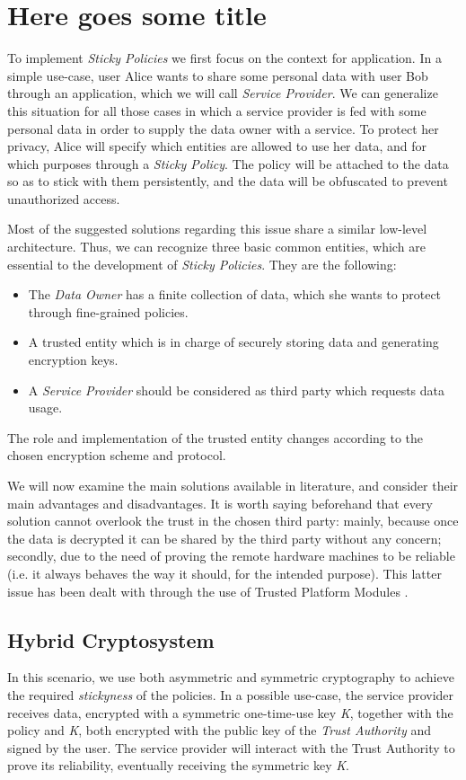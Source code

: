 \chapter{Here goes some title}
\label{chapter2}
\thispagestyle{empty}

To implement \textit{Sticky Policies} we first focus on the context for application. In a simple use-case, user Alice wants to share some personal data with user Bob through an application, which we will call \textit{Service Provider}. We can generalize this situation for all those cases in which a service provider is fed with some personal data in order to supply the data owner with a service. To protect her privacy, Alice will specify which entities are allowed to use her data, and for which purposes through a \textit{Sticky Policy}. The policy will be attached to the data so as to stick with them persistently, and the data will be obfuscated to prevent unauthorized access.

Most of the suggested solutions regarding this issue share a similar low-level architecture. Thus, we can recognize three basic common entities, which are essential to the development of \textit{Sticky Policies}. They are the following: 
 \begin{itemize}
 	\item The \textit{Data Owner} has a finite collection of data, which she wants to protect through fine-grained policies.
 	\item A trusted entity which is in charge of securely storing data and generating encryption keys.
 	\item A \textit{Service Provider} should be considered as third party which requests data usage.
 \end{itemize}
The role and implementation of the trusted entity changes according to the chosen encryption scheme and protocol.

We will now examine the main solutions available in literature, and consider their main advantages and disadvantages. It is worth saying beforehand that every solution cannot overlook the trust in the chosen third party: mainly, because once the data is decrypted it can be shared by the third party without any concern; secondly, due to the need of proving the remote hardware machines to be reliable (i.e. it always behaves the way it should, for the intended purpose). This latter issue has been dealt with through the use of Trusted Platform Modules \cite{standard2009trusted}.

\section{Hybrid Cryptosystem}
In this scenario, we use both asymmetric and symmetric cryptography to achieve the required \textit{stickyness} of the policies. In a possible use-case, the service provider receives data, encrypted with a symmetric one-time-use key \textit{K}, together with the policy and \textit{K}, both encrypted with the public key of the \textit{Trust Authority} and signed by the user. The service provider will interact with the Trust Authority to prove its reliability, eventually receiving the symmetric key \textit{K}.


